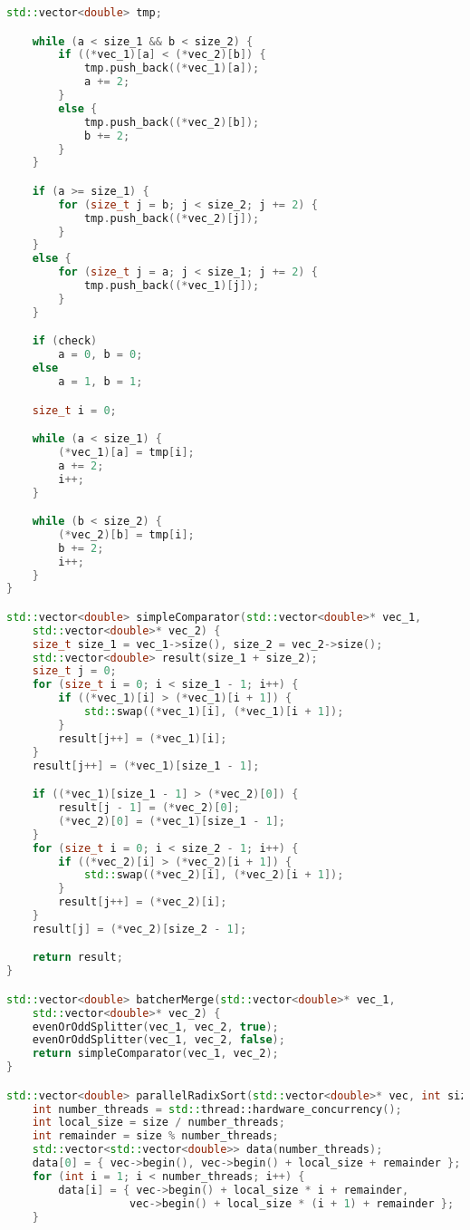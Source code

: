 \documentclass{report}
\begin{document}
\begin{lstlisting}[language=C++]
    std::vector<double> tmp;

    while (a < size_1 && b < size_2) {
        if ((*vec_1)[a] < (*vec_2)[b]) {
            tmp.push_back((*vec_1)[a]);
            a += 2;
        }
        else {
            tmp.push_back((*vec_2)[b]);
            b += 2;
        }
    }

    if (a >= size_1) {
        for (size_t j = b; j < size_2; j += 2) {
            tmp.push_back((*vec_2)[j]);
        }
    }
    else {
        for (size_t j = a; j < size_1; j += 2) {
            tmp.push_back((*vec_1)[j]);
        }
    }

    if (check)
        a = 0, b = 0;
    else
        a = 1, b = 1;

    size_t i = 0;

    while (a < size_1) {
        (*vec_1)[a] = tmp[i];
        a += 2;
        i++;
    }

    while (b < size_2) {
        (*vec_2)[b] = tmp[i];
        b += 2;
        i++;
    }
}

std::vector<double> simpleComparator(std::vector<double>* vec_1,
    std::vector<double>* vec_2) {
    size_t size_1 = vec_1->size(), size_2 = vec_2->size();
    std::vector<double> result(size_1 + size_2);
    size_t j = 0;
    for (size_t i = 0; i < size_1 - 1; i++) {
        if ((*vec_1)[i] > (*vec_1)[i + 1]) {
            std::swap((*vec_1)[i], (*vec_1)[i + 1]);
        }
        result[j++] = (*vec_1)[i];
    }
    result[j++] = (*vec_1)[size_1 - 1];

    if ((*vec_1)[size_1 - 1] > (*vec_2)[0]) {
        result[j - 1] = (*vec_2)[0];
        (*vec_2)[0] = (*vec_1)[size_1 - 1];
    }
    for (size_t i = 0; i < size_2 - 1; i++) {
        if ((*vec_2)[i] > (*vec_2)[i + 1]) {
            std::swap((*vec_2)[i], (*vec_2)[i + 1]);
        }
        result[j++] = (*vec_2)[i];
    }
    result[j] = (*vec_2)[size_2 - 1];

    return result;
}

std::vector<double> batcherMerge(std::vector<double>* vec_1,
    std::vector<double>* vec_2) {
    evenOrOddSplitter(vec_1, vec_2, true);
    evenOrOddSplitter(vec_1, vec_2, false);
    return simpleComparator(vec_1, vec_2);
}

std::vector<double> parallelRadixSort(std::vector<double>* vec, int size) {
    int number_threads = std::thread::hardware_concurrency();
    int local_size = size / number_threads;
    int remainder = size % number_threads;
    std::vector<std::vector<double>> data(number_threads);
    data[0] = { vec->begin(), vec->begin() + local_size + remainder };
    for (int i = 1; i < number_threads; i++) {
        data[i] = { vec->begin() + local_size * i + remainder,
                   vec->begin() + local_size * (i + 1) + remainder };
    }


\end{lstlisting}
\end{document}
